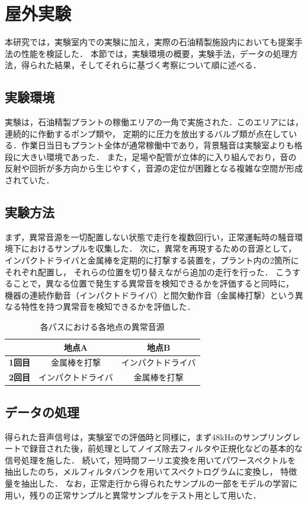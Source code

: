 \documentclass[../main]{subfiles}
\begin{document}
\section{屋外実験}
\label{sec:outdoor_experiment}
本研究では，実験室内での実験に加え，実際の石油精製施設内においても提案手法の性能を検証した．
本節では，実験環境の概要，実験手法，データの処理方法，得られた結果，そしてそれらに基づく考察について順に述べる．
\subsection{実験環境}
\label{subsec:vexp_ci_environment}
実験は，石油精製プラントの稼働エリアの一角で実施された．このエリアには，連続的に作動するポンプ類や，
定期的に圧力を放出するバルブ類が点在している．作業日当日もプラント全体が通常稼働中であり，背景騒音は実験室よりも格段に大きい環境であった．
また，足場や配管が立体的に入り組んでおり，音の反射や回折が多方向から生じやすく，音源の定位が困難となる複雑な空間が形成されていた．
\subsection{実験方法}
\label{subsec:vexp_ci_method}

まず，異常音源を一切配置しない状態で走行を複数回行い，正常運転時の騒音環境下におけるサンプルを収集した．
次に，異常を再現するための音源として，インパクトドライバと金属棒を定期的に打撃する装置を，プラント内の2箇所にそれぞれ配置し，
それらの位置を切り替えながら追加の走行を行った．
こうすることで，異なる位置で発生する異常音を検知できるかを評価すると同時に，
機器の連続作動音（インパクトドライバ）と間欠動作音（金属棒打撃）という異なる特性を持つ異常音を検知できるかを評価した．

\begin{table}[htbp]
  \centering
  \caption{各パスにおける各地点の異常音源}
  \label{tab:abnormal_sound_jp}
  \begin{tabular}{c|c|c}
  \hline
   & \textbf{地点A} & \textbf{地点B} \\ \hline
  \textbf{1回目} & 金属棒を打撃 & インパクトドライバ \\
  \textbf{2回目} & インパクトドライバ & 金属棒を打撃 \\ \hline
  \end{tabular}
\end{table}

\subsection{データの処理}
\label{subsec:vexp_ci_processing}
得られた音声信号は，実験室での評価時と同様に，まず48kHzのサンプリングレートで録音された後，前処理としてノイズ除去フィルタや正規化などの基本的な信号処理を施した．
続いて，短時間フーリエ変換を用いてパワースペクトルを抽出したのち，メルフィルタバンクを用いてスペクトログラムに変換し，
特徴量を抽出した．
なお，正常走行から得られたサンプルの一部をモデルの学習に用い，残りの正常サンプルと異常サンプルをテスト用として用いた．
\end{document}

